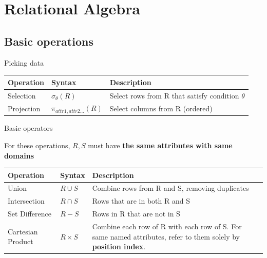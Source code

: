 \section{Relational Algebra}

\subsection{Basic operations}

\begin{theorem}
    {Picking data}
    \begin{tabular}{l|l|l}
        Operation  & Syntax                    & Description                                        \\
        \hline
        Selection  & $\sigma_{\theta}(R)$      & Select rows from R that satisfy condition $\theta$ \\
        Projection & $\pi_{attr1,attr2...}(R)$ & Select columns from R (ordered)                    \\
    \end{tabular}
\end{theorem}

\begin{definition}
    {Basic operators}

    For these operations, $R,S$ must have \textbf{the same attributes with same domains}

    \begin{tabular}{l|l|p{10cm}}
        Operation         & Syntax       & Description                                                                                                           \\
        \hline
        Union             & $R \cup S$   & Combine rows from R and S, removing duplicates                                                                        \\
        Intersection      & $R \cap S$   & Rows that are in both R and S                                                                                         \\
        Set Difference    & $R - S$      & Rows in R that are not in S                                                                                           \\
        Cartesian Product & $R \times S$ & Combine each row of R with each row of S. For same named attributes, refer to them solely by \textbf{position index}. \\
    \end{tabular}
\end{definition}

